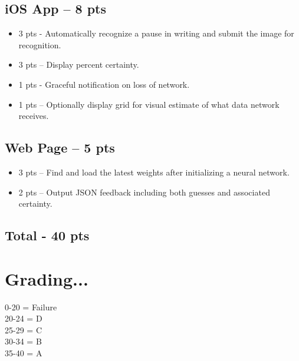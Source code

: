 \documentclass{article}
\begin{document}
	\subsection{iOS App – 8 pts}
		\begin{itemize}  pt
			\item 3 pts - Automatically recognize a pause in writing and submit the image for recognition.
			\item 3 pts – Display percent certainty.
			\item 1 pts - Graceful notification on loss of network.
			\item 1 pts – Optionally display grid for visual estimate of what data network receives.
		\end{itemize}
	\subsection{Web Page – 5 pts}
		\begin{itemize}  pt
			\item 3 pts – Find and load the latest weights after initializing a neural network.
			\item 2 pts – Output JSON feedback including both guesses and associated certainty.
		\end{itemize}
	\subsection{Total - 40 pts}
	
\section{Grading...}
0-20 = Failure \\
20-24 = D \\
25-29 = C \\
30-34 = B \\
35-40 = A \\
\end{document}

